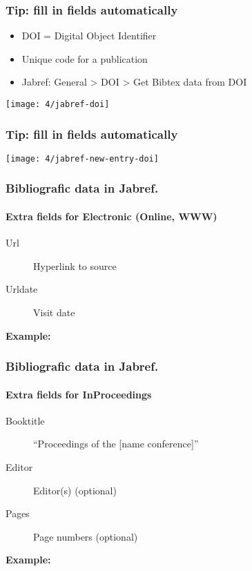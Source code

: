 \documentclass[aspectratio=169]{beamer}
\begin{document}
\begin{frame}
  \frametitle{Tip: fill in fields automatically}

  \begin{itemize}
    \item DOI = Digital Object Identifier
    \item Unique code for a publication
    \item Jabref: General > DOI > Get Bibtex data from DOI
  \end{itemize}

  \bigskip

  \centering
  \texttt{[image: 4/jabref-doi]}

\end{frame}

\begin{frame}[plain]
  \frametitle{Tip: fill in fields automatically}

  \centering
  \texttt{[image: 4/jabref-new-entry-doi]}

\end{frame}

\begin{frame}[plain]
  \frametitle{Bibliografic data in Jabref.}
  \framesubtitle{Extra fields for Electronic (Online, WWW)}

  \begin{description}
    \item[Url] Hyperlink to source
    \item[Urldate] Visit date
  \end{description}

  \bigskip

  \textbf{Example:}

  \bigskip


\end{frame}

\begin{frame}[plain]
  \frametitle{Bibliografic data in Jabref.}
  \framesubtitle{Extra fields for InProceedings}

  \begin{description}
    \item[Booktitle] ``Proceedings of the [name conference]''
    \item[Editor] Editor(s) (optional)
    \item[Pages] Page numbers (optional)
  \end{description}

  \medskip

  \textbf{Example:}

\end{frame}
\end{document}

